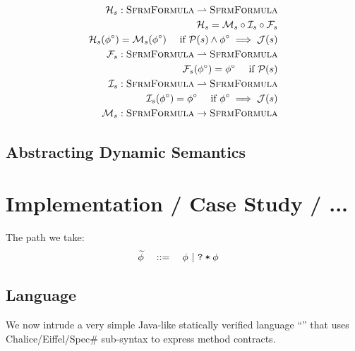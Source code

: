 \begin{align*}
\mathcal{H}_s : \textsc{SfrmFormula} \rightharpoonup \textsc{SfrmFormula}\\
\mathcal{H}_s = \mathcal{M}_s \circ \mathcal{I}_s \circ \mathcal{F}_s\\
\mathcal{H}_s({\phi}^{\circ}) = \mathcal{M}_s({\phi}^{\circ}) \quad\text{ if $\mathcal{P}(s) \wedge {\phi}^{\circ} \implies \mathcal{J}(s)$} \\
\mathcal{F}_s : \textsc{SfrmFormula} \rightharpoonup \textsc{SfrmFormula}\\
\mathcal{F}_s({\phi}^{\circ}) = {\phi}^{\circ} \quad\text{ if $\mathcal{P}(s)$} \\
\mathcal{I}_s : \textsc{SfrmFormula} \rightharpoonup \textsc{SfrmFormula}\\
\mathcal{I}_s({\phi}^{\circ}) = {\phi}^{\circ} \quad\text{ if ${\phi}^{\circ} \implies \mathcal{J}(s)$} \\
\mathcal{M}_s : \textsc{SfrmFormula} \rightarrow \textsc{SfrmFormula}\\
\end{align*}



\section{Abstracting Dynamic Semantics}


\chapter{Implementation / Case Study / ...}
The path we take:
\begin{align*}
&\widetilde{\phi} \quad ::= \quad \phi ~|~ \texttt{\texttt{?}\:*\:$\phi$}
\end{align*}

\section{Language}
We now intrude a very simple Java-like statically verified language “\svl” that uses Chalice/Eiffel/Spec\# %
sub-syntax to express method contracts.


